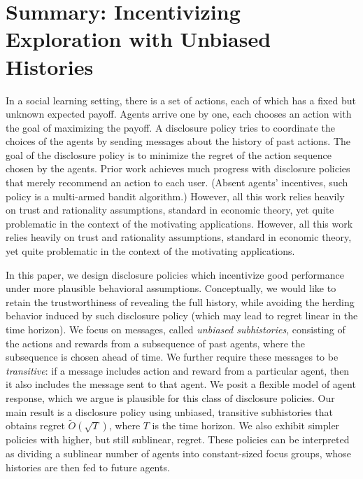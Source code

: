 \documentclass[11pt,letterpaper]{article}
\begin{document}

\section*{Summary: Incentivizing Exploration with Unbiased Histories}


In a social learning setting, there is a set of actions, each of which has a fixed but unknown expected payoff. Agents arrive one by one, each chooses an action with the goal of maximizing the payoff.  A disclosure policy tries to coordinate the choices of the agents by sending messages about the history of past actions. The goal of the disclosure policy is to minimize the regret of the action sequence chosen by the agents. Prior work achieves much progress with disclosure policies that merely recommend an action to each user. (Absent agents' incentives, such policy is a multi-armed bandit algorithm.) However, all this work relies heavily on trust and rationality assumptions, standard in economic theory, yet quite problematic in the context of the motivating applications. However, all this work relies heavily on trust and rationality assumptions, standard in economic theory, yet quite problematic in the context of the motivating applications.

In this paper, we design disclosure policies which incentivize good performance under more plausible behavioral assumptions. Conceptually, we would like to retain the trustworthiness of revealing the full history, while avoiding the herding behavior induced by such disclosure policy (which may lead to regret linear in the time horizon). We focus on messages, called {\em unbiased subhistories}, consisting of the actions and rewards from a subsequence of past agents, where the subsequence is chosen ahead of time. We further require these messages to be \emph{transitive}: if a message includes action and reward from a particular agent, then it also includes the message sent to that agent. We posit a flexible model of agent response, which we argue is plausible for this class of disclosure policies. Our main result is a disclosure policy using unbiased, transitive subhistories that obtains regret $\tilde{O}(\sqrt{T})$, where $T$ is the time horizon.  We also exhibit simpler policies with higher, but still sublinear, regret.  These policies can be interpreted as dividing a sublinear number of agents into constant-sized focus groups, whose histories are then fed to future agents.
\end{document}
